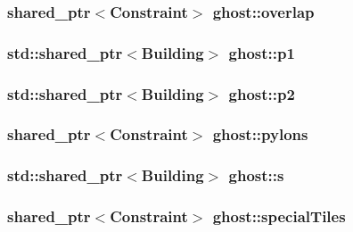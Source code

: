 \hypertarget{namespaceghost_a7a91cd37137a7eae220126fcbb8ff96b}{
\subsubsection[{overlap}]{\setlength{\rightskip}{0pt plus 5cm}shared\-\_\-ptr$<${\bf Constraint}$>$ ghost\-::overlap}}\label{namespaceghost_a7a91cd37137a7eae220126fcbb8ff96b}
\hypertarget{namespaceghost_ad597936cfadde60ce8c6ed70f14c242c}{
\subsubsection[{p1}]{\setlength{\rightskip}{0pt plus 5cm}std\-::shared\-\_\-ptr$<${\bf Building}$>$ ghost\-::p1}}\label{namespaceghost_ad597936cfadde60ce8c6ed70f14c242c}
\hypertarget{namespaceghost_a47f813abed554f342cbabdd87c34a89e}{
\subsubsection[{p2}]{\setlength{\rightskip}{0pt plus 5cm}std\-::shared\-\_\-ptr$<${\bf Building}$>$ ghost\-::p2}}\label{namespaceghost_a47f813abed554f342cbabdd87c34a89e}
\hypertarget{namespaceghost_a381584b094da85f582a9b24eedf21411}{
\subsubsection[{pylons}]{\setlength{\rightskip}{0pt plus 5cm}shared\-\_\-ptr$<${\bf Constraint}$>$ ghost\-::pylons}}\label{namespaceghost_a381584b094da85f582a9b24eedf21411}
\hypertarget{namespaceghost_a21eab9fd4ae07c7db20e824cc4452a97}{
\subsubsection[{s}]{\setlength{\rightskip}{0pt plus 5cm}std\-::shared\-\_\-ptr$<${\bf Building}$>$ ghost\-::s}}\label{namespaceghost_a21eab9fd4ae07c7db20e824cc4452a97}
\hypertarget{namespaceghost_a41140633099e7f2158ce39ca3a469abb}{
\subsubsection[{special\-Tiles}]{\setlength{\rightskip}{0pt plus 5cm}shared\-\_\-ptr$<${\bf Constraint}$>$ ghost\-::special\-Tiles}}\label{namespaceghost_a41140633099e7f2158ce39ca3a469abb}

